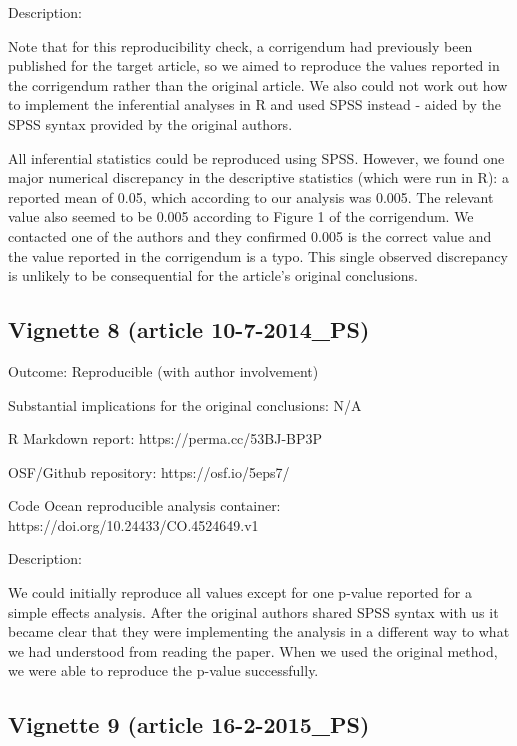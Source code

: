\documentclass[english,,man,floatsintext]{apa6}
\begin{document}
\begin{appendix}
Description:

Note that for this reproducibility check, a corrigendum had previously
been published for the target article, so we aimed to reproduce the
values reported in the corrigendum rather than the original article. We
also could not work out how to implement the inferential analyses in R
and used SPSS instead - aided by the SPSS syntax provided by the
original authors.

All inferential statistics could be reproduced using SPSS. However, we
found one major numerical discrepancy in the descriptive statistics
(which were run in R): a reported mean of 0.05, which according to our
analysis was 0.005. The relevant value also seemed to be 0.005 according
to Figure 1 of the corrigendum. We contacted one of the authors and they
confirmed 0.005 is the correct value and the value reported in the
corrigendum is a typo. This single observed discrepancy is unlikely to
be consequential for the article's original conclusions.

\hypertarget{vignette-8-article-10-7-2014_ps}{%
\subsection{Vignette 8 (article
10-7-2014\_PS)}\label{vignette-8-article-10-7-2014_ps}}

Outcome: Reproducible (with author involvement)

Substantial implications for the original conclusions: N/A

R Markdown report: https://perma.cc/53BJ-BP3P

OSF/Github repository: https://osf.io/5eps7/

Code Ocean reproducible analysis container:
https://doi.org/10.24433/CO.4524649.v1

Description:

We could initially reproduce all values except for one p-value reported
for a simple effects analysis. After the original authors shared SPSS
syntax with us it became clear that they were implementing the analysis
in a different way to what we had understood from reading the paper.
When we used the original method, we were able to reproduce the p-value
successfully.

\hypertarget{vignette-9-article-16-2-2015_ps}{%
\subsection{Vignette 9 (article
16-2-2015\_PS)}\label{vignette-9-article-16-2-2015_ps}}


\end{appendix}
\end{document}
